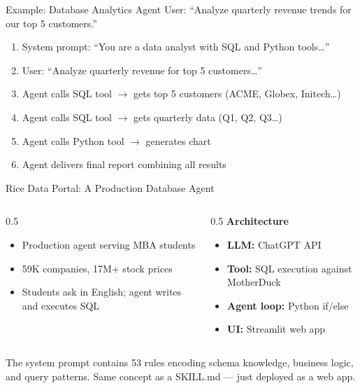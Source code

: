 \documentclass[aspectratio=169]{beamer}
\begin{document}
\begin{frame}{Example: Database Analytics Agent}
User: ``Analyze quarterly revenue trends for our top 5 customers.''
\vspace{0.3cm}
\begin{enumerate}\small
  \item System prompt: ``You are a data analyst with SQL and Python tools\ldots''
  \item User: ``Analyze quarterly revenue for top 5 customers\ldots''
  \item Agent calls SQL tool $\rightarrow$ gets top 5 customers (ACME, Globex, Initech\ldots)
  \item Agent calls SQL tool $\rightarrow$ gets quarterly data (Q1, Q2, Q3\ldots)
  \item Agent calls Python tool $\rightarrow$ generates chart
  \item Agent delivers final report combining all results
\end{enumerate}
\end{frame}

\begin{frame}{Rice Data Portal: A Production Database Agent}
\begin{columns}[T]
\begin{column}{0.5\textwidth}
\begin{itemize}\small
  \item Production agent serving MBA students
  \item 59K companies, 17M+ stock prices
  \item Students ask in English; agent writes and executes SQL
\end{itemize}
\end{column}
\begin{column}{0.5\textwidth}
\textbf{Architecture}
\begin{itemize}\small
  \item \textbf{LLM:} ChatGPT API
  \item \textbf{Tool:} SQL execution against MotherDuck
  \item \textbf{Agent loop:} Python if/else
  \item \textbf{UI:} Streamlit web app
\end{itemize}
\end{column}
\end{columns}
\vspace{0.3cm}
The system prompt contains 53 rules encoding schema knowledge, business logic, and query patterns. \alert{Same concept as a SKILL.md --- just deployed as a web app.}
\end{frame}
\end{document}
